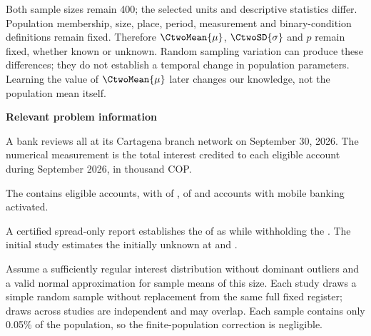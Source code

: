 Both sample sizes remain 400; the selected units and descriptive statistics differ. Population membership, size, place, period, measurement and binary-condition definitions remain fixed. Therefore $\CtwoMean{\mu}$, $\CtwoSD{\sigma}$ and $p$ remain fixed, whether known or unknown. Random sampling variation can produce these differences; they do not establish a temporal change in population parameters. Learning the value of $\CtwoMean{\mu}$ later changes our knowledge, not the population mean itself.

\secInicio[][sec:p2]

\clearpage



\textbf{Relevant problem information}

\begin{probleminfoexcerpt}
A bank reviews all      at its Cartagena branch network on September 30, 2026. The numerical measurement is the total interest credited to each eligible account during September 2026, in thousand COP.
\end{probleminfoexcerpt}

\begin{probleminfoexcerpt}
The     contains  eligible accounts, with    of   ,    of    and  accounts with mobile banking activated.
\end{probleminfoexcerpt}

\begin{probleminfoexcerpt}
A certified spread-only report establishes the    of  as    while withholding the   . The initial study estimates the initially unknown    at  and  .
\end{probleminfoexcerpt}

\begin{probleminfoexcerpt}
Assume a sufficiently regular interest distribution without dominant outliers and a valid normal approximation for sample means of this size. Each study draws a simple random sample without replacement from the same full fixed register; draws across studies are independent and may overlap. Each sample contains only 0.05\% of the population, so the finite-population correction is negligible.
\end{probleminfoexcerpt}

